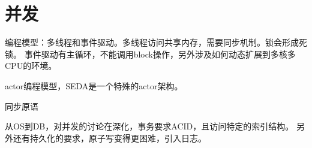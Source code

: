 \chapter{并发}

编程模型：多线程和事件驱动。多线程访问共享内存，需要同步机制。锁会形成死锁。
事件驱动有主循环，不能调用block操作，另外涉及如何动态扩展到多核多CPU的环境。

actor编程模型，SEDA是一个特殊的actor架构。

同步原语

从OS到DB，对并发的讨论在深化，事务要求ACID，且访问特定的索引结构。
另外还有持久化的要求，原子写变得更困难，引入日志。
